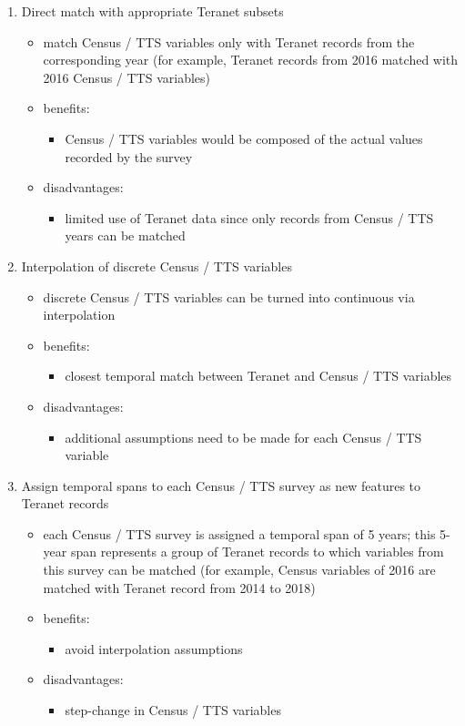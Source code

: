 \begin{enumerate}
    \item Direct match with appropriate Teranet subsets
    \begin{itemize}
        \item match Census / TTS variables only with Teranet records from the corresponding year (for example, Teranet records from 2016 matched with 2016 Census / TTS variables)
        \item benefits:
        \begin{itemize}
            \item Census / TTS variables would be composed of the actual values recorded by the survey
        \end{itemize}
        \item disadvantages:
        \begin{itemize}
            \item limited use of Teranet data since only records from Census / TTS years can be matched
        \end{itemize}
    \end{itemize}
    \item Interpolation of discrete Census / TTS variables
    \begin{itemize}
        \item discrete Census / TTS variables can be turned into continuous via interpolation
        \item benefits:
        \begin{itemize}
            \item closest temporal match between Teranet and Census / TTS variables
        \end{itemize}
        \item disadvantages:
        \begin{itemize}
            \item additional assumptions need to be made for each Census / TTS variable
        \end{itemize}
    \end{itemize}
    \item Assign temporal spans to each Census / TTS survey as new features to Teranet records
    \begin{itemize}
        \item each Census / TTS survey is assigned a temporal span of 5 years;
        this 5-year span represents a group of Teranet records to which variables from this survey can be matched (for example, Census variables of 2016 are matched with Teranet record from 2014 to 2018)
        \item benefits:
        \begin{itemize}
            \item avoid interpolation assumptions
        \end{itemize}
        \item disadvantages:
        \begin{itemize}
            \item step-change in Census / TTS variables
        \end{itemize}
    \end{itemize}
\end{enumerate}

